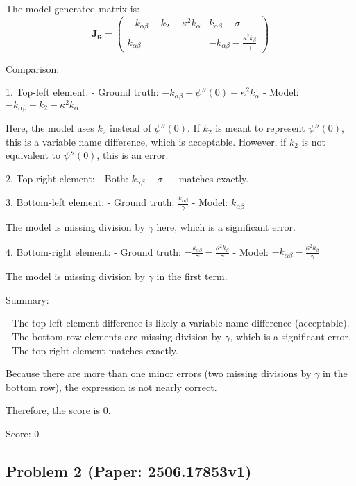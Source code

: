 \documentclass[10pt]{article}
\begin{document}
The model-generated matrix is:
\[
\mathbf{J}_{\boldsymbol{\kappa}} = \begin{pmatrix}
-k_{\alpha\beta} - k_2 - \kappa^2 k_\alpha & k_{\alpha\beta} - \sigma \\
k_{\alpha\beta} & -k_{\alpha\beta} - \frac{\kappa^2 k_\beta}{\gamma}
\end{pmatrix}
\]

Comparison:

1. Top-left element:
- Ground truth: \(-k_{\alpha\beta} - \psi''(0) - \kappa^2 k_\alpha\)
- Model: \(-k_{\alpha\beta} - k_2 - \kappa^2 k_\alpha\)

Here, the model uses \(k_2\) instead of \(\psi''(0)\). If \(k_2\) is meant to represent \(\psi''(0)\), this is a variable name difference, which is acceptable. However, if \(k_2\) is not equivalent to \(\psi''(0)\), this is an error.

2. Top-right element:
- Both: \(k_{\alpha\beta} - \sigma\) — matches exactly.

3. Bottom-left element:
- Ground truth: \(\frac{k_{\alpha\beta}}{\gamma}\)
- Model: \(k_{\alpha\beta}\)

The model is missing division by \(\gamma\) here, which is a significant error.

4. Bottom-right element:
- Ground truth: \(-\frac{k_{\alpha\beta}}{\gamma} - \frac{\kappa^2 k_\beta}{\gamma}\)
- Model: \(-k_{\alpha\beta} - \frac{\kappa^2 k_\beta}{\gamma}\)

The model is missing division by \(\gamma\) in the first term.

Summary:

- The top-left element difference is likely a variable name difference (acceptable).
- The bottom row elements are missing division by \(\gamma\), which is a significant error.
- The top-right element matches exactly.

Because there are more than one minor errors (two missing divisions by \(\gamma\) in the bottom row), the expression is not nearly correct.

Therefore, the score is 0.

Score: 0

\newpage
\subsection*{Problem 2 (Paper: 2506.17853v1)}
\end{document}
